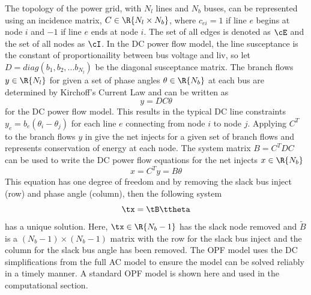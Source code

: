 The topology of the power grid, with $N_l$ lines and $N_b$ buses, can be represented using an incidence matrix, $C \in \R{N_l \times N_b}$, where $c_{ei}=1$ if line $e$ begins at node $i$ and $-1$ if line $e$ ends at node $i$.  The set of all edges is denoted as $\cE$ and the set of all nodes as $\cI$.  In the DC power flow model, the line susceptance is the constant of proportionaility between bus voltage and liv, so let $D=diag\left(b_1,b_2,...b_{N_l}\right)$ be the diagonal susceptance matrix.  The branch flows $y \in \R{N_l}$ for given a set of phase angles $\theta \in \R{N_b}$ at each bus are determined by Kirchoff's Current Law and can be written as
\begin{equation}\label{kcl}
y=D C \theta
\end{equation}
for the DC power flow model.  This results in the typical DC line constraints $y_{e} = b_{e} (\theta_i - \theta_j)$ for each line $e$ connecting from node $i$ to node $j$.  Applying $C^T$ to the branch flows $y$ in  give the net injects for a given set of branch flows and represents conservation of energy at each node.
  The system matrix $B = C^T D C$ can be used to write the DC power flow equations for the net injects $x \in \R{N_b}$
\begin{equation}\label{dcpow}
x = C^T y = B \theta
\end{equation}
This equation has one degree of freedom and by removing the slack bus inject (row) and phase angle (column), then the following system
\begin{equation}
\tx = \tB \ttheta
\end{equation}
has a unique solution.   Here, $\tx \in \R{N_b-1}$ has the slack node removed and $\tilde{B}$ is a $(N_b-1) \times (N_b-1)$ matrix with the row for the slack bus inject and the column for the slack bus angle has been removed.  The OPF model uses the DC simplifications from the full AC model to ensure the model can be solved reliably in a timely manner.  A standard OPF model is shown here and used in the computational section.

